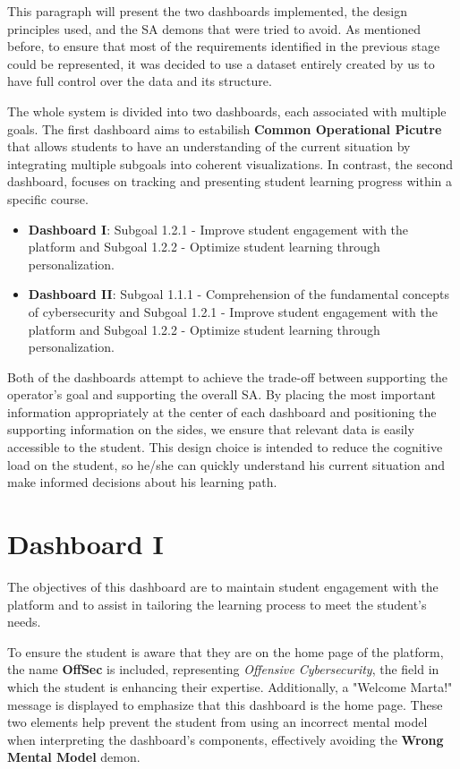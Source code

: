 This paragraph will present the two dashboards implemented, the design principles used, and the SA demons that were tried to avoid. As mentioned before, to ensure that most of the requirements identified in the previous stage could be represented, it was decided to use a dataset entirely created by us to have full control over the data and its structure.

The whole system is divided into two dashboards, each associated with multiple goals. The first dashboard aims to estabilish \textbf{Common Operational Picutre} that allows students to have an understanding of the current situation by integrating multiple subgoals into coherent visualizations. 
In contrast, the second dashboard, focuses on tracking and presenting student learning progress within a specific course.

\begin{itemize}
    \item \textbf{Dashboard I}: Subgoal 1.2.1 - Improve student engagement with the platform and Subgoal 1.2.2 - Optimize student learning through personalization.
    \item \textbf{Dashboard II}: Subgoal 1.1.1 - Comprehension of the fundamental concepts of cybersecurity and Subgoal 1.2.1 - Improve student engagement with the platform and Subgoal 1.2.2 - Optimize student learning through personalization.
\end{itemize} 

Both of the dashboards attempt to achieve the trade-off between supporting the operator's goal and supporting the overall SA. By placing the most important information appropriately at the center of each dashboard and positioning the supporting information on the sides, we ensure that relevant data is easily accessible to the student. This design choice is intended to reduce the cognitive load on the student, so he/she can quickly understand his current situation and make informed decisions about his learning path.


\section{Dashboard I}

The objectives of this dashboard are to maintain student engagement with the platform and to assist in tailoring the learning process to meet the student's needs.

To ensure the student is aware that they are on the home page of the platform, the name \textbf{OffSec} is included, representing \textit{Offensive Cybersecurity}, the field in which the student is enhancing their expertise. Additionally, a "Welcome Marta!" message is displayed to emphasize that this dashboard is the home page. These two elements help prevent the student from using an incorrect mental model when interpreting the dashboard's components, effectively avoiding the \textbf{Wrong Mental Model} demon.

